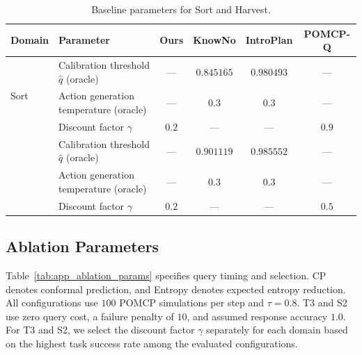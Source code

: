 \begin{table}[!htbp]
\centering
\caption{Baseline parameters for Sort and Harvest.}
\label{tab:app_baseline_params}
\footnotesize
\setlength{\tabcolsep}{2pt}
\renewcommand{\arraystretch}{1.05}
\setlength{\extrarowheight}{0pt}
\begin{tabular*}{\textwidth}{@{\extracolsep{\fill}}llcccc@{}}
\toprule
Domain & Parameter & \textbf{Ours} & KnowNo & IntroPlan & POMCP-Q \\
\midrule
\multirow{3}{*}{Sort} & Calibration threshold $\hat{q}$ (oracle) & --- & $0.845165$ & $0.980493$ & --- \\
 & Action generation temperature (oracle) & --- & $0.3$ & $0.3$ & --- \\
 & Discount factor $\gamma$ & $0.2$ & --- & --- & $0.9$ \\
\addlinespace[3pt]
\multirow{3}{*}{Harvest} & Calibration threshold $\hat{q}$ (oracle) & --- & $0.901119$ & $0.985552$ & --- \\
 & Action generation temperature (oracle) & --- & $0.3$ & $0.3$ & --- \\
 & Discount factor $\gamma$ & $0.2$ & --- & --- & $0.5$ \\
\bottomrule
\end{tabular*}
\end{table}

\subsection{Ablation Parameters}\label{appx:ablation_configs}
Table~\ref{tab:app_ablation_params} specifies query timing and selection. CP denotes conformal prediction, and Entropy denotes expected entropy reduction. All configurations use $100$ POMCP simulations per step and $\tau=0.8$. T3 and S2 use zero query cost, a failure penalty of $10$, and assumed response accuracy $1.0$. For T3 and S2, we select the discount factor $\gamma$ separately for each domain based on the highest task success rate among the evaluated configurations.

